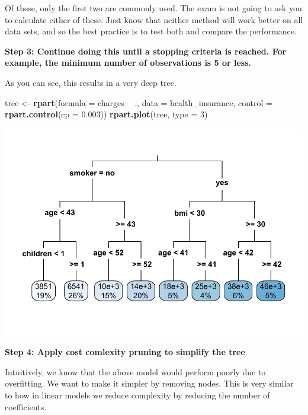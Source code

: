 \documentclass[openany]{book}
\newenvironment{Shaded}{\begin{snugshade}}{\end{snugshade}}
\newcommand{\DataTypeTok}[1]{\textcolor[rgb]{0.13,0.29,0.53}{#1}}
\newcommand{\DecValTok}[1]{\textcolor[rgb]{0.00,0.00,0.81}{#1}}
\newcommand{\FloatTok}[1]{\textcolor[rgb]{0.00,0.00,0.81}{#1}}
\newcommand{\KeywordTok}[1]{\textcolor[rgb]{0.13,0.29,0.53}{\textbf{#1}}}
\newcommand{\NormalTok}[1]{#1}
\newcommand{\OperatorTok}[1]{\textcolor[rgb]{0.81,0.36,0.00}{\textbf{#1}}}
\newcommand{\StringTok}[1]{\textcolor[rgb]{0.31,0.60,0.02}{#1}}
\begin{document}
Of these, only the first two are commonly used. The exam is not going to ask you to calculate either of these. Just know that neither method will work better on all data sets, and so the best practice is to test both and compare the performance.

\textbf{Step 3: Continue doing this until a stopping criteria is reached. For example, the minimum number of observations is 5 or less.}

As you can see, this results in a very deep tree.

\begin{Shaded}
\begin{Highlighting}[]
\NormalTok{tree <-}\StringTok{ }\KeywordTok{rpart}\NormalTok{(}\DataTypeTok{formula =}\NormalTok{ charges }\OperatorTok{~}\StringTok{  }\NormalTok{., }\DataTypeTok{data =}\NormalTok{ health_insurance,}
              \DataTypeTok{control =} \KeywordTok{rpart.control}\NormalTok{(}\DataTypeTok{cp =} \FloatTok{0.003}\NormalTok{))}
\KeywordTok{rpart.plot}\NormalTok{(tree, }\DataTypeTok{type =} \DecValTok{3}\NormalTok{)}
\end{Highlighting}
\end{Shaded}

\includegraphics{06-tree-based-models_files/figure-latex/unnamed-chunk-4-1.pdf}

\textbf{Step 4: Apply cost comlexity pruning to simplify the tree}

Intuitively, we know that the above model would perform poorly due to overfitting. We want to make it simpler by removing nodes. This is very similar to how in linear models we reduce complexity by reducing the number of coefficients.
\end{document}
